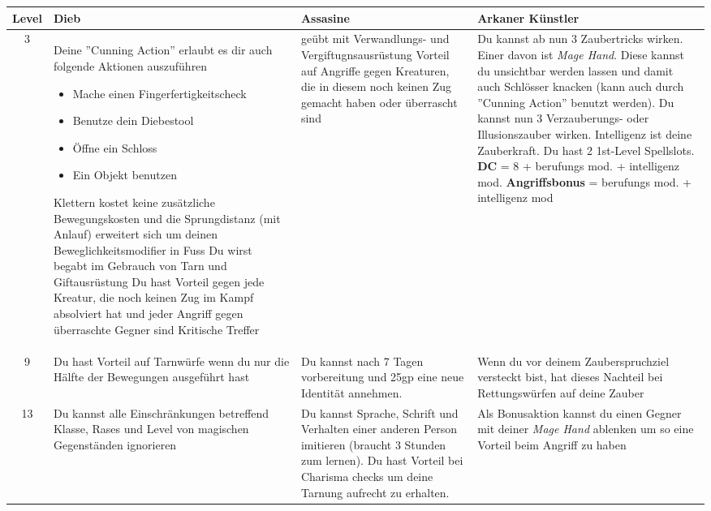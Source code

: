 \begin{table}
	\centering
	\begin{tabular}{cp{6cm}p{6cm}p{6cm}}
	\textbf{Level} & \textbf{Dieb} & \textbf{Assasine} &\textbf{Arkaner Künstler}\\ \hline
		
	3 &
	Deine ''Cunning Action'' erlaubt es dir auch folgende Aktionen auszuführen
	\begin{itemize}
		\item Mache einen Fingerfertigkeitscheck
		\item Benutze dein Diebestool
		\item Öffne ein Schloss
		\item Ein Objekt benutzen
	\end{itemize}		
	Klettern kostet keine zusätzliche Bewegungskosten und die Sprungdistanz (mit Anlauf) erweitert sich um deinen Beweglichkeitsmodifier in Fuss
	Du wirst begabt im Gebrauch von Tarn und Giftausrüstung \linebreak
	Du hast Vorteil gegen jede Kreatur, die noch keinen Zug im Kampf absolviert hat und jeder Angriff gegen überraschte Gegner sind Kritische Treffer&
	
    geübt mit Verwandlungs- und Vergiftugnsausrüstung\newline
    Vorteil auf Angriffe gegen Kreaturen, die in diesem noch keinen Zug gemacht haben oder überrascht sind&
	
    Du kannst ab nun 3 Zaubertricks wirken. Einer davon ist \textit{Mage Hand}. Diese kannst du unsichtbar werden lassen und damit auch Schlösser knacken (kann auch durch ''Cunning Action'' benutzt werden).\newline
    Du kannst nun 3 Verzauberungs- oder Illusionszauber wirken. Intelligenz ist deine Zauberkraft. Du hast 2 1st-Level Spellslots.\newline
    \textbf{DC} = 8 + berufungs mod. + intelligenz mod.\newline
    \textbf{Angriffsbonus} = berufungs mod. + intelligenz mod\\ \hline
	
	9 &
	Du hast Vorteil auf Tarnwürfe wenn du nur die Hälfte der Bewegungen ausgeführt hast&
	Du kannst nach 7 Tagen vorbereitung und 25gp eine neue Identität annehmen.&
	Wenn du vor deinem Zauberspruchziel versteckt bist, hat dieses Nachteil bei Rettungswürfen auf deine Zauber\\ \hline

	13 &
	Du kannst alle Einschränkungen betreffend Klasse, Rases und Level von magischen Gegenständen ignorieren&
	Du kannst Sprache, Schrift und Verhalten einer anderen Person imitieren (braucht 3 Stunden zum lernen). Du hast Vorteil bei Charisma checks um deine Tarnung aufrecht zu erhalten.&
	Als Bonusaktion kannst du einen Gegner mit deiner \textit{Mage Hand} ablenken um so eine Vorteil beim Angriff zu haben\\ \hline
	

\end{tabular}
\end{table}
